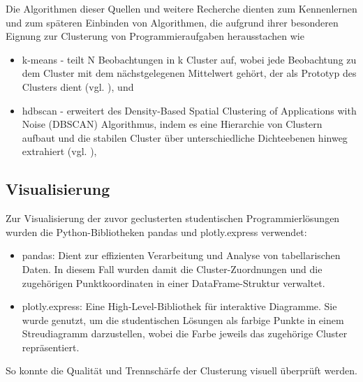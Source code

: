Die Algorithmen dieser Quellen und weitere Recherche dienten zum Kennenlernen und zum späteren Einbinden von Algorithmen, die aufgrund ihrer besonderen Eignung zur Clusterung von Programmieraufgaben herausstachen wie 
\begin{itemize}
    \item k-means - teilt N Beobachtungen in k Cluster auf, wobei jede Beobachtung zu dem Cluster mit dem nächstgelegenen Mittelwert gehört, der als Prototyp des Clusters dient (vgl. \cite{MacQueen.1967}), und
    \item hdbscan - erweitert des Density-Based Spatial Clustering of Applications with Noise (DBSCAN) Algorithmus, indem es eine Hierarchie von Clustern aufbaut und die stabilen Cluster über unterschiedliche Dichteebenen hinweg extrahiert (vgl. \cite{CampelloRicardoJ.G.B..}),
\end{itemize}

\subsection{Visualisierung}
Zur Visualisierung der zuvor geclusterten studentischen Programmierlösungen wurden die Python-Bibliotheken pandas und plotly.express verwendet:
\begin{itemize}
    \item pandas: Dient zur effizienten Verarbeitung und Analyse von tabellarischen Daten. In diesem Fall wurden damit die Cluster-Zuordnungen und die zugehörigen Punktkoordinaten in einer DataFrame-Struktur verwaltet.
    \item plotly.express: Eine High-Level-Bibliothek für interaktive Diagramme. Sie wurde genutzt, um die studentischen Lösungen als farbige Punkte in einem Streudiagramm darzustellen, wobei die Farbe jeweils das zugehörige Cluster repräsentiert.
\end{itemize}
So konnte die Qualität und Trennschärfe der Clusterung visuell überprüft werden.

